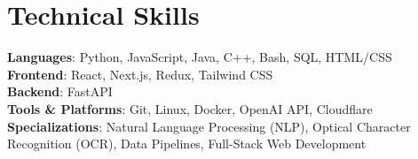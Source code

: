 \documentclass[letterpaper,11pt]{article}
\begin{document}
\section{Technical Skills}
\begin{itemize}[leftmargin=0.15in, label={}]
  \small{\item{
        \textbf{Languages}{: Python, JavaScript, Java, C++, Bash, SQL, HTML/CSS
        } \\
        \textbf{Frontend}{: React, Next.js, Redux, Tailwind CSS} \\
        \textbf{Backend}{: FastAPI} \\
        \textbf{Tools \& Platforms}{: Git, Linux, Docker, OpenAI API, Cloudflare} \\
        \textbf{Specializations}{: Natural Language Processing (NLP), Optical Character Recognition (OCR), Data Pipelines, Full-Stack Web Development}
        }}
\end{itemize}

\end{document}
